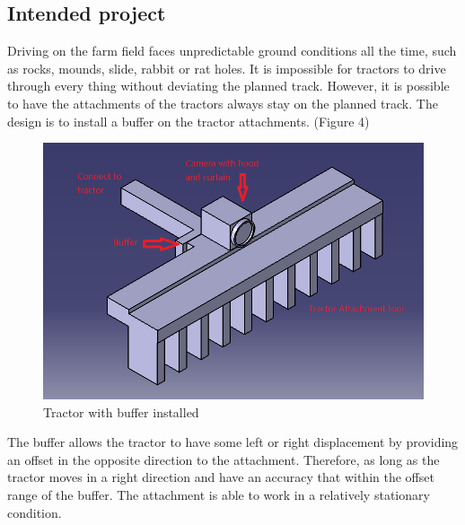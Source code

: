 \documentclass[12pt]{article}
\begin{document}
\begin{flushleft}
\subsection{Intended project}

Driving on the farm field faces unpredictable ground conditions all the time, such as rocks, mounds, slide, rabbit or rat holes. It is impossible for tractors to drive through every thing without deviating the planned track. However, it is possible to have the attachments of the tractors always stay on the planned track. The design is to install a buffer on the tractor attachments. (Figure 4)
\begin{figure}[ht!]
	\begin{center}
		\includegraphics[scale = 0.8]{attachmentwithbuffer.png}
		\caption{Tractor with buffer installed}
	\end{center}
\end{figure} 
The buffer allows the tractor to have some left or right displacement by providing an offset in the opposite direction to the attachment. Therefore, as long as the tractor moves in a right direction and have an accuracy that within the offset range of the buffer. The attachment is able to work in a relatively stationary condition. 


\end{flushleft}
\end{document}
